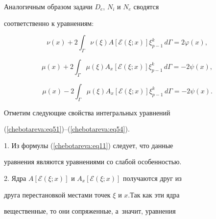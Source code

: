 Аналогичным образом задачи $D_e $,  $N_i $ и $N_e $ сводятся


соответственно к уравнениям:


\begin{equation}


\label{chebotareva:eq52} \nu(x) + 2\int_{\Gamma} \nu (\xi)


A\left[\mathcal{E}\left(\xi; x\right)\right]\xi_{p - 1}^{k}\,d\Gamma


= 2\varphi (x) , 


\end{equation}


\begin{equation}


\label{chebotareva:eq53} \mu(x) + 2\int_{\Gamma} \mu (\xi)


A_{x}\left[\mathcal{E}\left(\xi; x\right)\right]\xi_{p -


1}^{k}\,d\Gamma =-2\psi (x), 


\end{equation}


\begin{equation}


\label{chebotareva:eq54}  \mu(x) - 2\int_{\Gamma} \mu (\xi)


A_{x}\left[\mathcal{E}\left(\xi; x\right)\right]\xi_{p -


1}^{k}\,d\Gamma =-2\psi (x) .


\end{equation}





Отметим следующие свойства интегральных уравнений


(\ref{chebotareva:eq51})--(\ref{chebotareva:eq54}).





1. Из формулы (\ref{chebotareva:eq11}) следует,  что данные


уравнения являются уравнениями со слабой особенностью.





2. Ядра $A\left[ \mathcal{E}\left(\xi; x\right)\right]$ и $A_x


\left[ \mathcal{E}\left(\xi; x\right) \right]$ получаются друг из


друга перестановкой местами точек $\xi $ и $x. $Так как эти ядра


вещественные,  то они сопряженные,  а~значит, уравнения


